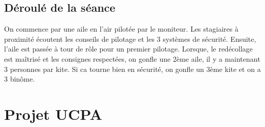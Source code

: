 \documentclass[11pt,a4paper]{report}
\begin{document}
\section{Déroulé de la séance}
On commence par une aile en l'air pilotée par le moniteur.
Les stagiaires à proximité écoutent les conseils de pilotage et les 3 systèmes
de sécurité.
Ensuite, l'aile est passée à tour de rôle pour un premier pilotage.
Lorsque, le redécollage est maîtrisé et les consignes respectées, 
on gonfle une 2ème aile, il y a maintenant 3 personnes par kite.
Si ca tourne bien en sécurité, on gonfle un 3ème kite et on a 3 binôme.


\chapter{Projet UCPA\label{ucpa_projet}}



\end{document}
